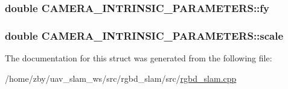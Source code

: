 \hypertarget{struct_c_a_m_e_r_a___i_n_t_r_i_n_s_i_c___p_a_r_a_m_e_t_e_r_s_a02f0af7d5baf32da452b7ddbd5ae5b2c}{
\subsubsection[{fy}]{\setlength{\rightskip}{0pt plus 5cm}double C\-A\-M\-E\-R\-A\-\_\-\-I\-N\-T\-R\-I\-N\-S\-I\-C\-\_\-\-P\-A\-R\-A\-M\-E\-T\-E\-R\-S\-::fy}}\label{struct_c_a_m_e_r_a___i_n_t_r_i_n_s_i_c___p_a_r_a_m_e_t_e_r_s_a02f0af7d5baf32da452b7ddbd5ae5b2c}
\hypertarget{struct_c_a_m_e_r_a___i_n_t_r_i_n_s_i_c___p_a_r_a_m_e_t_e_r_s_a8d97381ee4d6181c922ac00d84a80e93}{
\subsubsection[{scale}]{\setlength{\rightskip}{0pt plus 5cm}double C\-A\-M\-E\-R\-A\-\_\-\-I\-N\-T\-R\-I\-N\-S\-I\-C\-\_\-\-P\-A\-R\-A\-M\-E\-T\-E\-R\-S\-::scale}}\label{struct_c_a_m_e_r_a___i_n_t_r_i_n_s_i_c___p_a_r_a_m_e_t_e_r_s_a8d97381ee4d6181c922ac00d84a80e93}


The documentation for this struct was generated from the following file\-:\begin{DoxyCompactItemize}
\item 
/home/zby/uav\-\_\-slam\-\_\-ws/src/rgbd\-\_\-slam/src/\hyperlink{rgbd__slam_8cpp}{rgbd\-\_\-slam.\-cpp}\end{DoxyCompactItemize}
